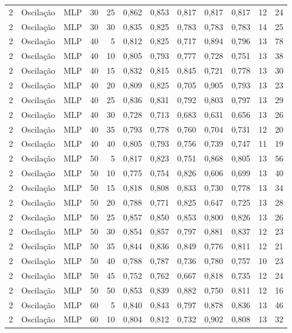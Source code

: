 \begin{longtable}{@{}rllrrrrrrrrr@{}}
2 & Oscilação & MLP & 30 & 25 & 0,862 & 0,853 & 0,817 & 0,817 & 0,817 & 12 & 24 \\
2 & Oscilação & MLP & 30 & 30 & 0,835 & 0,825 & 0,783 & 0,783 & 0,783 & 14 & 25 \\
2 & Oscilação & MLP & 40 & 5 & 0,812 & 0,825 & 0,717 & 0,894 & 0,796 & 13 & 78 \\
2 & Oscilação & MLP & 40 & 10 & 0,805 & 0,793 & 0,777 & 0,728 & 0,751 & 13 & 38 \\
2 & Oscilação & MLP & 40 & 15 & 0,832 & 0,815 & 0,845 & 0,721 & 0,778 & 13 & 30 \\
2 & Oscilação & MLP & 40 & 20 & 0,809 & 0,825 & 0,705 & 0,905 & 0,793 & 13 & 23 \\
2 & Oscilação & MLP & 40 & 25 & 0,836 & 0,831 & 0,792 & 0,803 & 0,797 & 13 & 29 \\
2 & Oscilação & MLP & 40 & 30 & 0,728 & 0,713 & 0,683 & 0,631 & 0,656 & 13 & 26 \\
2 & Oscilação & MLP & 40 & 35 & 0,793 & 0,778 & 0,760 & 0,704 & 0,731 & 12 & 20 \\
2 & Oscilação & MLP & 40 & 40 & 0,805 & 0,793 & 0,756 & 0,739 & 0,747 & 11 & 19 \\
2 & Oscilação & MLP & 50 & 5 & 0,817 & 0,823 & 0,751 & 0,868 & 0,805 & 13 & 56 \\
2 & Oscilação & MLP & 50 & 10 & 0,775 & 0,754 & 0,826 & 0,606 & 0,699 & 13 & 40 \\
2 & Oscilação & MLP & 50 & 15 & 0,818 & 0,808 & 0,833 & 0,730 & 0,778 & 13 & 34 \\
2 & Oscilação & MLP & 50 & 20 & 0,788 & 0,771 & 0,825 & 0,647 & 0,725 & 13 & 28 \\
2 & Oscilação & MLP & 50 & 25 & 0,857 & 0,850 & 0,853 & 0,800 & 0,826 & 13 & 26 \\
2 & Oscilação & MLP & 50 & 30 & 0,854 & 0,857 & 0,797 & 0,881 & 0,837 & 12 & 23 \\
2 & Oscilação & MLP & 50 & 35 & 0,844 & 0,836 & 0,849 & 0,776 & 0,811 & 12 & 21 \\
2 & Oscilação & MLP & 50 & 40 & 0,788 & 0,787 & 0,736 & 0,780 & 0,757 & 10 & 23 \\
2 & Oscilação & MLP & 50 & 45 & 0,752 & 0,762 & 0,667 & 0,818 & 0,735 & 12 & 24 \\
2 & Oscilação & MLP & 50 & 50 & 0,853 & 0,839 & 0,882 & 0,750 & 0,811 & 12 & 16 \\
2 & Oscilação & MLP & 60 & 5 & 0,840 & 0,843 & 0,797 & 0,878 & 0,836 & 13 & 46 \\
2 & Oscilação & MLP & 60 & 10 & 0,804 & 0,812 & 0,732 & 0,902 & 0,808 & 13 & 32 \\

\end{longtable}
